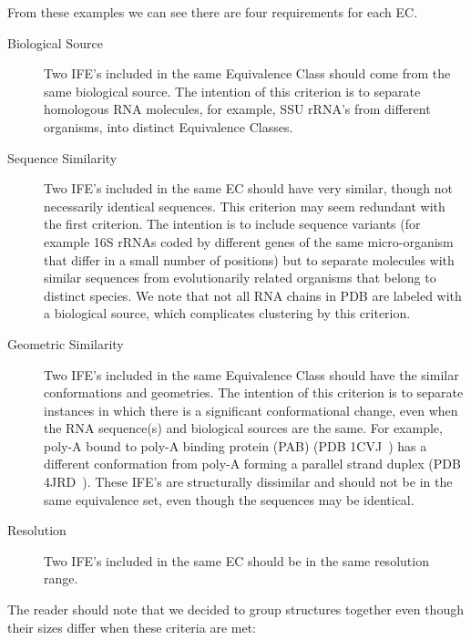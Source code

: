 From these examples we can see there are four requirements for each EC\@.
\begin{description}
  \item[Biological Source] Two IFE's included in the same Equivalence Class
    should come from the same biological source. The intention of this criterion
    is to separate homologous RNA molecules, for example, SSU rRNA's from
    different organisms, into distinct Equivalence Classes.

  \item[Sequence Similarity] Two IFE's included in the same EC should have very
    similar, though not necessarily identical sequences. This criterion may seem
    redundant with the first criterion. The intention is to include sequence
    variants (for example 16S rRNAs coded by different genes of the same
    micro-organism that differ in a small number of positions) but to separate
    molecules with similar sequences from evolutionarily related organisms that
    belong to distinct species. We note that not all RNA chains in PDB are
    labeled with a biological source, which complicates clustering by this
    criterion.

  \item[Geometric Similarity] Two IFE's included in the same Equivalence Class
    should have the similar conformations and geometries. The intention of this
    criterion is to separate instances in which there is a significant
    conformational change, even when the RNA sequence(s) and biological sources
    are the same. For example, poly-A bound to poly-A binding protein (PAB) (PDB
    1CVJ~\cite{Deo1999}) has a different conformation from poly-A forming a
    parallel strand duplex (PDB 4JRD~\cite{Safaee2013}). These IFE's are
    structurally dissimilar and should not be in the same equivalence set, even
    though the sequences may be identical.

  \item[Resolution] Two IFE's included in the same EC should be in the same
    resolution range.
\end{description}

The reader should note that we decided to group structures together even though
their sizes differ when these criteria are met:

